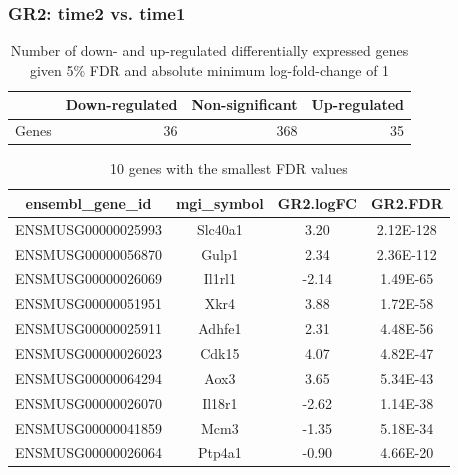 \documentclass[12pt]{article}
\begin{document}
\subsubsection{GR2: time2 vs. time1}

\begin{table}[ht]
\centering
\begin{tabular}{rrrr}
  \hline
 & Down-regulated & Non-significant & Up-regulated \\ 
  \hline
Genes & 36 & 368 & 35 \\ 
   \hline
\end{tabular}
\caption{Number of down- and up-regulated differentially expressed genes given 5\% FDR and absolute minimum log-fold-change of 1 } 
\end{table}%
\begin{table}[H]
\centering
\begingroup\footnotesize
\begin{tabular}{cccc}
  \hline
ensembl\_gene\_id & mgi\_symbol & GR2.logFC & GR2.FDR \\ 
  \hline
ENSMUSG00000025993 & Slc40a1 & 3.20 & 2.12E-128 \\ 
  ENSMUSG00000056870 & Gulp1 & 2.34 & 2.36E-112 \\ 
  ENSMUSG00000026069 & Il1rl1 & -2.14 & 1.49E-65 \\ 
  ENSMUSG00000051951 & Xkr4 & 3.88 & 1.72E-58 \\ 
  ENSMUSG00000025911 & Adhfe1 & 2.31 & 4.48E-56 \\ 
  ENSMUSG00000026023 & Cdk15 & 4.07 & 4.82E-47 \\ 
  ENSMUSG00000064294 & Aox3 & 3.65 & 5.34E-43 \\ 
  ENSMUSG00000026070 & Il18r1 & -2.62 & 1.14E-38 \\ 
  ENSMUSG00000041859 & Mcm3 & -1.35 & 5.18E-34 \\ 
  ENSMUSG00000026064 & Ptp4a1 & -0.90 & 4.66E-20 \\ 
   \hline
\end{tabular}
\endgroup
\caption{10 genes with the smallest FDR values} 
\end{table}
\end{document}
